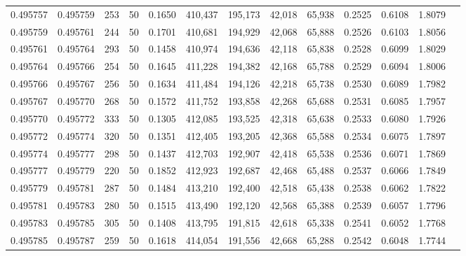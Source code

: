 \begin{tabular}{rrrrrrrrrrrrr}
0.495757 & 0.495759 &   253 &  50 &                                     0.1650 & 410,437 & 195,173 &  42,018 &  65,938 & 0.2525 & 0.6108 & 1.8079 \\
0.495759 & 0.495761 &   244 &  50 &                                     0.1701 & 410,681 & 194,929 &  42,068 &  65,888 & 0.2526 & 0.6103 & 1.8056 \\
0.495761 & 0.495764 &   293 &  50 &                                     0.1458 & 410,974 & 194,636 &  42,118 &  65,838 & 0.2528 & 0.6099 & 1.8029 \\
0.495764 & 0.495766 &   254 &  50 &                                     0.1645 & 411,228 & 194,382 &  42,168 &  65,788 & 0.2529 & 0.6094 & 1.8006 \\
0.495766 & 0.495767 &   256 &  50 &                                     0.1634 & 411,484 & 194,126 &  42,218 &  65,738 & 0.2530 & 0.6089 & 1.7982 \\
0.495767 & 0.495770 &   268 &  50 &                                     0.1572 & 411,752 & 193,858 &  42,268 &  65,688 & 0.2531 & 0.6085 & 1.7957 \\
0.495770 & 0.495772 &   333 &  50 &                                     0.1305 & 412,085 & 193,525 &  42,318 &  65,638 & 0.2533 & 0.6080 & 1.7926 \\
0.495772 & 0.495774 &   320 &  50 &                                     0.1351 & 412,405 & 193,205 &  42,368 &  65,588 & 0.2534 & 0.6075 & 1.7897 \\
0.495774 & 0.495777 &   298 &  50 &                                     0.1437 & 412,703 & 192,907 &  42,418 &  65,538 & 0.2536 & 0.6071 & 1.7869 \\
0.495777 & 0.495779 &   220 &  50 &                                     0.1852 & 412,923 & 192,687 &  42,468 &  65,488 & 0.2537 & 0.6066 & 1.7849 \\
0.495779 & 0.495781 &   287 &  50 &                                     0.1484 & 413,210 & 192,400 &  42,518 &  65,438 & 0.2538 & 0.6062 & 1.7822 \\
0.495781 & 0.495783 &   280 &  50 &                                     0.1515 & 413,490 & 192,120 &  42,568 &  65,388 & 0.2539 & 0.6057 & 1.7796 \\
0.495783 & 0.495785 &   305 &  50 &                                     0.1408 & 413,795 & 191,815 &  42,618 &  65,338 & 0.2541 & 0.6052 & 1.7768 \\
0.495785 & 0.495787 &   259 &  50 &                                     0.1618 & 414,054 & 191,556 &  42,668 &  65,288 & 0.2542 & 0.6048 & 1.7744 \\

\end{tabular}
